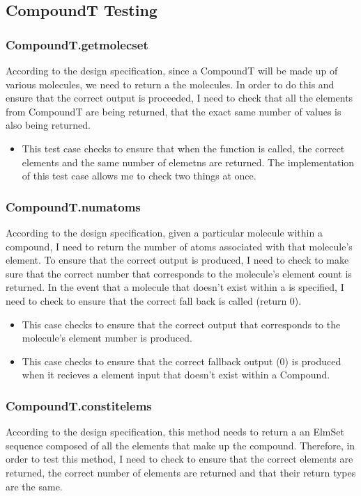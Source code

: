\documentclass[12pt]{article}
\begin{document}
\subsection{CompoundT Testing}

\subsubsection{CompoundT.get\textunderscore molec\textunderscore set}
According to the design specification, since a CompoundT will be made up of various molecules, we need to return a the molecules.
In order to do this and ensure that the correct output is proceeded, I need to check that all the elements from CompoundT are being returned,
that the exact same number of values is also being returned.

\begin{itemize}
  \item This test case checks to ensure that when the function is called, the correct elements and the same number of elemetns are returned.
  The implementation of this test case allows me to check two things at once. 
\end{itemize}

\subsubsection{CompoundT.num\textunderscore atoms}
According to the design specification, given a particular molecule within a compound, I need to return the number of atoms associated with that molecule's 
element. To ensure that the correct output is produced, I need to check to make sure that the correct number that corresponds to the molecule's element count is 
returned. In the event that a molecule that doesn't exist within a is specified, I need to check to ensure that the correct fall back is called (return 0).

\begin{itemize}
  \item This case checks to ensure that the correct output that corresponds to the molecule's element number is produced.
  \item This case checks to ensure that the correct fallback output (0) is produced when it recieves a element input that doesn't exist within a Compound.
\end{itemize}

\subsubsection{CompoundT.constit\textunderscore elems}
According to the design specification, this method needs to return a an ElmSet sequence composed of all the elements that make up the compound.
Therefore, in order to test this method, I need to check to ensure that the correct elements are returned, the correct number of elements are returned
and that their return types are the same.
\end{document}
